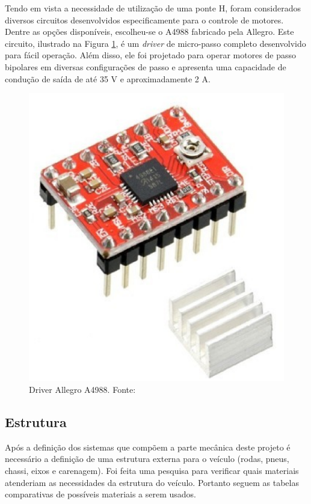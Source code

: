     Tendo em vista a necessidade de utilização de uma ponte H, foram considerados diversos circuitos desenvolvidos especificamente para o controle de motores. Dentre as opções disponíveis, escolheu-se o A4988 fabricado pela Allegro. Este circuito, ilustrado na Figura \ref{fig:drivepasso}, é um \textit{driver} de micro-passo completo desenvolvido para fácil operação. Além disso, ele foi projetado para operar motores de passo bipolares em diversas configurações de passo e apresenta uma capacidade de condução de saída de até 35 V e aproximadamente 2 A.
    
                \begin{figure}[!h]
                	\centering
                	\includegraphics[keepaspectratio=true, scale=0.4]{figuras/drive_passo.eps}
                	\caption{Driver Allegro A4988. Fonte: \cite{flop}}
                	\label{fig:drivepasso}
                \end{figure}
                

      
  \subsection{Estrutura}
  Após a definição dos sistemas que compõem a parte mecânica deste projeto é necessário a definição de uma estrutura externa para o veículo (rodas, pneus, chassi, eixos e carenagem). Foi feita uma pesquisa para verificar quais materiais atenderiam as necessidades da estrutura do veículo. Portanto seguem as tabelas comparativas de possíveis materiais a serem usados.

